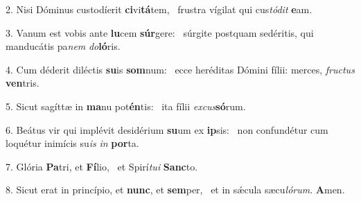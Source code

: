 2. Nisi Dóminus custodíerit \textbf{ci}vi\textbf{tá}tem, \ast\  frustra vígilat qui cus\textit{tó}\textit{dit} \textbf{e}am.\

3. Vanum est vobis ante \textbf{lu}cem \textbf{súr}gere: \ast\  súrgite postquam sedéritis, qui manducátis pa\textit{nem} \textit{do}\textbf{ló}ris.\

4. Cum déderit diléctis \textbf{su}is \textbf{som}num: \ast\  ecce heréditas Dómini fílii: merces, \textit{fruc}\textit{tus} \textbf{ven}tris.\

5. Sicut sagíttæ in \textbf{ma}nu pot\textbf{én}tis: \ast\  ita fílii \textit{ex}\textit{cus}\textbf{só}rum.\

6. Beátus vir qui implévit desidérium \textbf{su}um ex \textbf{ip}sis: \ast\  non confundétur cum loquétur inimícis su\textit{is} \textit{in} \textbf{por}ta.\

7. Glória \textbf{Pa}tri, et \textbf{Fí}lio, \ast\  et Spirí\textit{tu}\textit{i} \textbf{Sanc}to.\

8. Sicut erat in princípio, et \textbf{nunc}, et \textbf{sem}per, \ast\  et in sǽcula sæcu\textit{ló}\textit{rum}. \textbf{A}men.\

